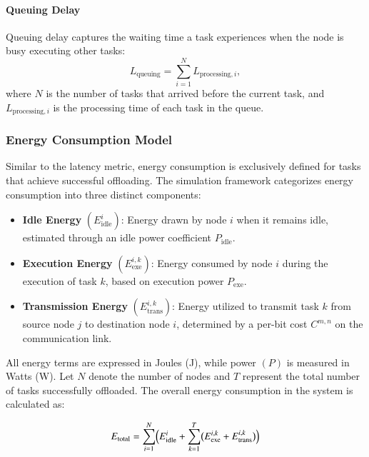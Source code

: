 \documentclass[preprint,3p,authoryear]{elsarticle}
\begin{document}
\paragraph{Queuing Delay}
Queuing delay captures the waiting time a task experiences when the node is busy executing other tasks:
\begin{equation}
L_{\text{queuing}} = \sum_{i=1}^{N} L_{\text{processing}, i},
\end{equation}
where \( N \) is the number of tasks that arrived before the current task, and \( L_{\text{processing}, i} \) is the processing time of each task in the queue.

\subsubsection{Energy Consumption Model}\label{subsec:energy_consumption}

Similar to the latency metric, energy consumption is exclusively defined for tasks that achieve successful offloading. The simulation framework categorizes energy consumption into three distinct components:

\begin{itemize}
    \item \textbf{Idle Energy} $(E_{\text{idle}}^{i})$: Energy drawn by node $i$ when it remains idle, estimated through an idle power coefficient $P_{\text{idle}}$.
    \item \textbf{Execution Energy} $(E_{\text{exe}}^{i,k})$: Energy consumed by node $i$ during the execution of task $k$, based on execution power $P_{\text{exe}}$.
    \item \textbf{Transmission Energy} $(E_{\text{trans}}^{i,k})$: Energy utilized to transmit task $k$ from source node $j$ to destination node $i$, determined by a per-bit cost $C^{m,n}$ on the communication link.
\end{itemize}

All energy terms are expressed in Joules (J), while power $(P)$ is measured in Watts (W). Let $N$ denote the number of nodes and $T$ represent the total number of tasks successfully offloaded. The overall energy consumption in the system is calculated as:

\begin{equation}
E_{\text{total}} = 
    \sum_{i=1}^{N}
    \Bigl( E_{\text{idle}}^{i} + \sum_{k=1}^{T} 
    \bigl(E_{\text{exe}}^{i,k} + E_{\text{trans}}^{i,k}\bigr) \Bigr)
\end{equation}
\end{document}
